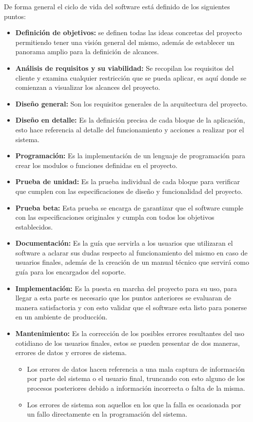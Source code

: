 	De forma general el ciclo de vida del software est\'a definido de los siguientes puntos:
	\begin{itemize}
		\item \textbf{Definici\'on de objetivos:} se definen todas las ideas concretas del proyecto permitiendo tener una visi\'on general del mismo, adem\'as de establecer un panorama amplio para la definici\'on de alcances.
		\item \textbf{An\'alisis de requisitos y su viabilidad:} Se recopilan los requisitos del cliente y examina cualquier restricci\'on que se pueda aplicar, es aqu\'i donde se comienzan a visualizar los alcances del proyecto.
		\item \textbf{Dise\~no general:} Son los requisitos generales de la arquitectura del proyecto.
		\item \textbf{Dise\~no en detalle:} Es la definici\'on precisa de cada bloque de la aplicaci\'on, esto hace referencia al detalle del funcionamiento y acciones a realizar por el sistema.
		\item \textbf{Programaci\'on:} Es la implementaci\'on de un lenguaje de programaci\'on para crear los modulos o funciones definidas en el proyecto.
		\item \textbf{Prueba de unidad:} Es la prueba individual de cada bloque para verificar que cumplen con las especificaciones de dise\~no y funcionalidad del proyecto.
		\item \textbf{Prueba beta:} Esta prueba se encarga de garantizar que el software cumple con las especificaciones originales y cumpla con todos los objetivos establecidos.
		\item \textbf{Documentaci\'on:} Es la gu\'ia que servirla a los usuarios que utilizaran el software a aclarar sus dudas respecto al funcionamiento del mismo en caso de usuarios finales, adem\'as de la creaci\'on de un manual t\'ecnico que servir\'a como gu\'ia para los encargados del soporte.
		\item \textbf{Implementaci\'on:} Es la puesta en marcha del proyecto para su uso, para llegar a esta parte es necesario que los puntos anteriores se evaluaran de manera satisfactoria y con esto validar que el software esta listo para ponerse en un ambiente de producci\'on.
		\item \textbf{Mantenimiento:} Es la correcci\'on de los posibles errores resultantes del uso cotidiano de los usuarios finales, estos se pueden presentar de dos maneras, errores de datos y errores de sistema. 
		\begin{itemize}
			\item Los errores de datos hacen referencia a una mala captura de informaci\'on por parte del sistema o el usuario final, truncando con esto alguno de los procesos posteriores debido a informaci\'on incorrecta o falta de la misma.
			\item Los errores de sistema son aquellos en los que la falla es ocasionada por un fallo directamente en la programaci\'on del sistema.
		\end{itemize}

	\end{itemize}

